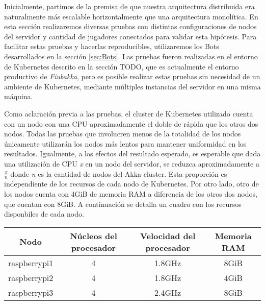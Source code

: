
\noindent Inicialmente, partimos de la premisa de que nuestra arquitectura distribuida era naturalmente más escalable horizontalmente
que una arquitectura monolítica. En esta sección realizaremos diversas pruebas con distintas configuraciones de nodos del servidor y cantidad
de jugadores conectados para validar esta hipótesis. Para facilitar estas pruebas y hacerlas reproducibles, utilizaremos los Bots desarrollados
en la sección \ref{sec:Bots}. Las pruebas fueron realizadas en el entorno de Kubernetes descrito en la sección TODO, que es actualmente el entorno
productivo de \textit{Fiubakka}, pero es posible realizar estas pruebas sin necesidad de un ambiente de Kubernetes, mediante múltiples instancias del
servidor en una misma máquina.

Como aclaración previa a las pruebas, el cluster de Kubernetes utilizado cuenta con un nodo con una CPU aproximadamente el doble de rápida que los otros dos nodos.
Todas las pruebas que involucren menos de la totalidad de los nodos únicamente utilizarán los nodos más lentos para mantener uniformidad en los resultados.
Igualmente, a los efectos del resultado esperado, es esperable que dada una utilización de CPU \textit{x} en un nodo del servidor, se reduzca aproximadamente a
$\frac{x}{n}$ donde \textit{n} es la cantidad de nodos del Akka cluster. Esta proporción es independiente de los recursos de cada nodo de Kubernetes. Por otro lado,
otro de los nodos cuenta con 4GiB de memoria RAM a diferencia de los otros dos nodos, que cuentan con 8GiB. A continuación se detalla un cuadro con los recursos disponbiles
de cada nodo.

\begin{center}
    \begin{tabular}{|c|c|c|c|}
    \hline
    \textbf{Nodo} & \textbf{Núcleos del procesador} & \textbf{Velocidad del procesador} & \textbf{Memoria RAM} \\
    \hline
    raspberrypi1 & 4 & 1.8GHz & 8GiB \\
    \hline
    raspberrypi2 & 4 & 1.8GHz & 4GiB \\
    \hline
    raspberrypi3 & 4 & 2.4GHz & 8GiB \\
    \hline
\end{tabular}
\end{center}

